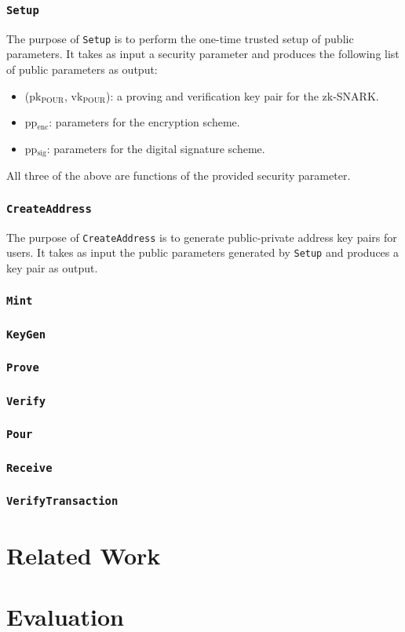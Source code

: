 \documentclass{article}
\begin{document}
\subsubsection{\texttt{Setup}}
The purpose of \texttt{Setup} is to perform the one-time trusted setup of public parameters. It takes as input a security parameter and produces the following list of public parameters as output:
\begin{itemize}
\item (pk$_{\text{POUR}}$, vk$_{\text{POUR}}$): a proving and verification key pair for the zk-SNARK.
\item pp$_{\text{enc}}$: parameters for the encryption scheme.
\item pp$_{\text{sig}}$: parameters for the digital signature scheme.
\end{itemize}
All three of the above are functions of the provided security parameter.

\subsubsection{\texttt{CreateAddress}}
The purpose of \texttt{CreateAddress} is to generate public-private address key pairs for users. It takes as input the public parameters generated by \texttt{Setup} and produces a key pair as output.

\subsubsection{\texttt{Mint}}
\subsubsection{\texttt{KeyGen}}
\subsubsection{\texttt{Prove}}
\subsubsection{\texttt{Verify}}
\subsubsection{\texttt{Pour}}
\subsubsection{\texttt{Receive}}
\subsubsection{\texttt{VerifyTransaction}}

\section{Related Work}
\section{Evaluation}

\newpage
\printbibliography
\end{document}
